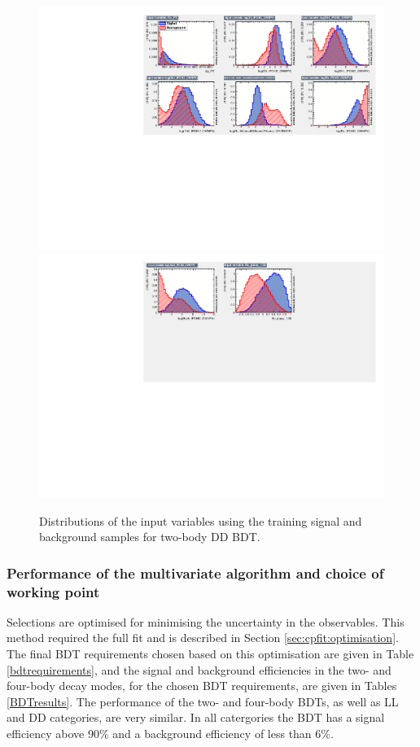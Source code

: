 \begin{figure}
\centering
\includegraphics[width=\linewidth]{figures/selection/inputvariables_KPi_DD_run1_1.pdf}
\includegraphics[trim = 0mm 50mm 0mm 0mm, clip,width=\linewidth]{figures/selection/inputvariables_KPi_DD_run1_2.pdf}
\caption{Distributions of the input variables using the training signal and background samples for two-body DD BDT.}
\label{BDTinputdist2bodyDD}
\end{figure}

\subsubsection{Performance of the multivariate algorithm and choice of working point}

Selections are optimised for minimising the uncertainty in the \CP observables. This method required the full fit and is described in Section \ref{sec:cpfit:optimisation}. The final BDT requirements chosen based on this optimisation are given in Table \ref{bdtrequirements}, and the signal and background efficiencies in the two- and four-body \Dz decay modes, for the chosen BDT requirements, are given in Tables \ref{BDTresults}. The performance of the two- and four-body BDTs, as well as LL and DD categories, are very similar. In all catergories the BDT has a signal efficiency above 90\% and a background efficiency of less than 6\%. 

